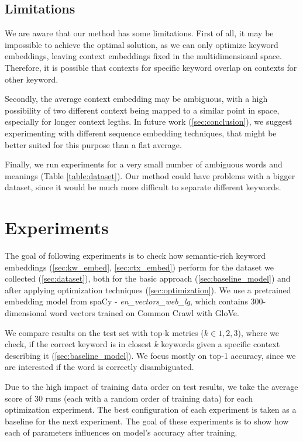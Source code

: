 \documentclass{llncs}
\begin{document}
\subsection{Limitations}
\label{sec:limitations}
We are aware that our method has some limitations.
First of all, it may be impossible to achieve the optimal solution, as we can only optimize keyword embeddings, leaving context embeddings fixed in the multidimensional space.
Therefore, it is possible that contexts for specific keyword overlap on contexts for other keyword.

Secondly, the average context embedding may be ambiguous, with a high possibility of two different context being mapped to a similar point in space, especially for longer context legths.
In future work (\ref{sec:conclusion}), we suggest experimenting with different sequence embedding techniques, that might be better suited for this purpose than a flat average.

Finally, we run experiments for a very small number of ambiguous words and meanings (Table \ref{table:dataset}). Our method could have problems with a bigger dataset, since it would be much more difficult to separate different keywords.


\section{Experiments}
\label{sec:experiments}
The goal of following experiments is to check how semantic-rich keyword embeddings (\ref{sec:kw_embed}, \ref{sec:ctx_embed}) perform for the dataset we collected (\ref{sec:dataset}), both for the basic approach (\ref{sec:baseline_model}) and after applying optimization techniques (\ref{sec:optimization}).
We use a pretrained embedding model from spaCy - \textit{en\_vectors\_web\_lg}, which contains 300-dimensional word vectors trained on Common Crawl with GloVe\cite{spacymodel}.

We compare results on the test set with top-k metrics (\(k \in {1, 2, 3}\)), where we check, if the correct keyword is in closest \(k\) keywords given a specific context describing it (\ref{sec:baseline_model}). We focus mostly on top-1 accuracy, since we are interested if the word is correctly disambiguated.

Due to the high impact of training data order on test results, we take the average score of 30 runs (each with a random order of training data) for each optimization experiment.
The best configuration of each experiment is taken as a baseline for the next experiment.
The goal of these experiments is to show how each of parameters influences on model's accuracy after training.
\end{document}

